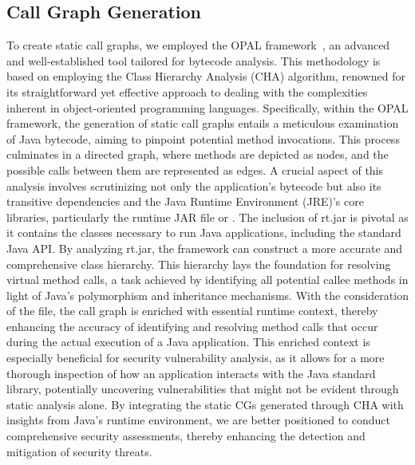 \subsection{Call Graph Generation}\label{ch2:subsec:cg_gen}
To create static call graphs, we employed the OPAL framework~\cite{eichberg2014software, helm2020modular}, an advanced and well-established tool tailored for bytecode analysis. This methodology is based on employing the Class Hierarchy Analysis (CHA) algorithm, renowned for its straightforward yet effective approach to dealing with the complexities inherent in object-oriented programming languages. Specifically, within the OPAL framework, the generation of static call graphs entails a meticulous examination of Java bytecode, aiming to pinpoint potential method invocations. This process culminates in a directed graph, where methods are depicted as nodes, and the possible calls between them are represented as edges. A crucial aspect of this analysis involves scrutinizing not only the application's bytecode but also its transitive dependencies and the Java Runtime Environment (JRE)'s core libraries, particularly the runtime JAR file or . The inclusion of rt.jar is pivotal as it contains the classes necessary to run Java applications, including the standard Java API. By analyzing rt.jar, the framework can construct a more accurate and comprehensive class hierarchy. This hierarchy lays the foundation for resolving virtual method calls, a task achieved by identifying all potential callee methods in light of Java's polymorphism and inheritance mechanisms.
With the consideration of the  file, the call graph is enriched with essential runtime context, thereby enhancing the accuracy of identifying and resolving method calls that occur during the actual execution of a Java application. This enriched context is especially beneficial for security vulnerability analysis, as it allows for a more thorough inspection of how an application interacts with the Java standard library, potentially uncovering vulnerabilities that might not be evident through static analysis alone. By integrating the static CGs generated through CHA with insights from Java's runtime environment, we are better positioned to conduct comprehensive security assessments, thereby enhancing the detection and mitigation of security threats.

